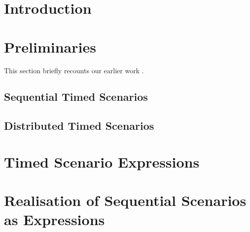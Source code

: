\documentclass[runningheads,a4paper]{llncs}
\begin{document}
\section{Introduction}
\label{sec-intro}

%
\section{Preliminaries}
\label{sec-prelim}
This section briefly recounts our
earlier work \cite{neda-2018-2,DTS-2025}.
\subsection{Sequential Timed Scenarios}
\label{sec-seq}

\subsection{Distributed Timed Scenarios}
\label{sec-dts}

\section{Timed Scenario Expressions}
\label{sec-exp}
%

\section{Realisation of Sequential Scenarios as Expressions}
\label{sec-realize}

\end{document}
